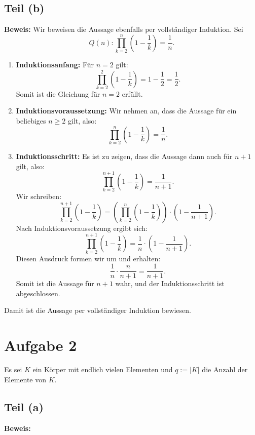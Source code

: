 \documentclass[11pt]{article}
\begin{document}
\subsection*{Teil (b)}

\textbf{Beweis:} Wir beweisen die Aussage ebenfalls per vollständiger Induktion. Sei
\[
Q(n) : \prod_{k=2}^n \left(1 - \frac{1}{k}\right) = \frac{1}{n}.
\]

\begin{enumerate}
    \item \textbf{Induktionsanfang:} Für \( n = 2 \) gilt:
    \[
    \prod_{k=2}^2 \left(1 - \frac{1}{k}\right) = 1 - \frac{1}{2} = \frac{1}{2}.
    \]
    Somit ist die Gleichung für \( n = 2 \) erfüllt.

    \item \textbf{Induktionsvoraussetzung:} Wir nehmen an, dass die Aussage für ein beliebiges \( n \geq 2 \) gilt, also:
    \[
    \prod_{k=2}^n \left(1 - \frac{1}{k}\right) = \frac{1}{n}.
    \]

    \item \textbf{Induktionsschritt:} Es ist zu zeigen, dass die Aussage dann auch für \( n+1 \) gilt, also:
    \[
    \prod_{k=2}^{n+1} \left(1 - \frac{1}{k}\right) = \frac{1}{n+1}.
    \]
    Wir schreiben:
    \[
    \prod_{k=2}^{n+1} \left(1 - \frac{1}{k}\right) = \left(\prod_{k=2}^n \left(1 - \frac{1}{k}\right)\right) \cdot \left(1 - \frac{1}{n+1}\right).
    \]
    Nach Induktionsvoraussetzung ergibt sich:
    \[
    \prod_{k=2}^{n+1} \left(1 - \frac{1}{k}\right) = \frac{1}{n} \cdot \left(1 - \frac{1}{n+1}\right).
    \]
    Diesen Ausdruck formen wir um und erhalten:
    \[
    \frac{1}{n} \cdot \frac{n}{n+1} = \frac{1}{n+1}.
    \]
    Somit ist die Aussage für \( n+1 \) wahr, und der Induktionsschritt ist abgeschlossen.
\end{enumerate}
Damit ist die Aussage per vollständiger Induktion bewiesen.


\section*{Aufgabe 2}

Es sei \( K \) ein Körper mit endlich vielen Elementen und \( q := |K| \) die Anzahl der Elemente von \( K \).

\subsection*{Teil (a)}

\textbf{Beweis:}
\end{document}
